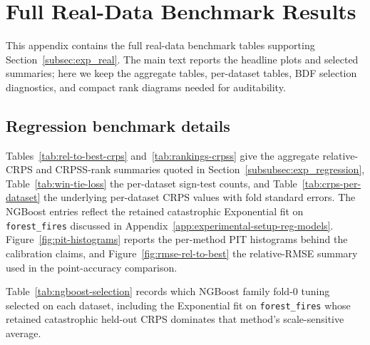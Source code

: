 \section{Full Real-Data Benchmark Results}\label{app:real-data-results}

This appendix contains the full real-data benchmark tables supporting Section~\ref{subsec:exp_real}. The main text reports the headline plots and selected summaries; here we keep the aggregate tables, per-dataset tables, BDF selection diagnostics, and compact rank diagrams needed for auditability.

\subsection{Regression benchmark details}\label{app:regression-additional}

Tables~\ref{tab:rel-to-best-crps} and~\ref{tab:rankings-crpss} give the aggregate relative-CRPS and CRPSS-rank summaries quoted in Section~\ref{subsubsec:exp_regression}, Table~\ref{tab:win-tie-loss} the per-dataset sign-test counts, and Table~\ref{tab:crps-per-dataset} the underlying per-dataset CRPS values with fold standard errors. The NGBoost entries reflect the retained catastrophic Exponential fit on \texttt{forest\_fires} discussed in Appendix~\ref{app:experimental-setup-reg-models}. Figure~\ref{fig:pit-histograms} reports the per-method PIT histograms behind the calibration claims, and Figure~\ref{fig:rmse-rel-to-best} the relative-RMSE summary used in the point-accuracy comparison.







\begin{landscape}

\end{landscape}

Table~\ref{tab:ngboost-selection} records which NGBoost family fold-0 tuning selected on each dataset, including the Exponential fit on \texttt{forest\_fires} whose retained catastrophic held-out CRPS dominates that method's scale-sensitive average.





